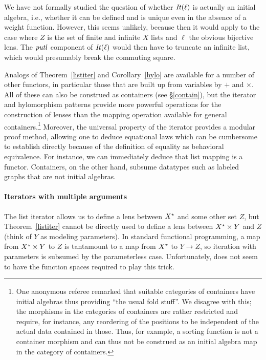 \begin{defn}[$R$-similarity]
\begin{theorem}
\begin{lemma}
\begin{theorem}[No products]
\begin{lemma}
\begin{defn}
\begin{theorem}
\begin{theorem}
\begin{corollary}[Hylomorphism]
We have not formally studied the question of whether $\mathit{It}(\ell)$
is actually an initial algebra, i.e., whether it can
be defined and is unique even in the absence of a weight function. However,
this seems unlikely, because then it would apply to the case where $Z$ is the
set of finite and infinite $X$ lists and $\ell$ the obvious bijective lens.
The $\mathit{putl}$ component of $\mathit{It}(\ell)$ would then have to truncate an infinite
list, which would presumably break the commuting square.

Analogs of Theorem~\ref{listiter} and
Corollary~\ref{hylo} are available for a number of other functors, in
particular those that are built up from variables by $+$ and $\times$.
All of these can also be construed as containers (see
\S\ref{contain}), but the iterator and hylomorphism patterns
provide more powerful operations for the construction of lenses than
the mapping operation available for general containers.\footnote{One anonymous referee remarked that suitable categories of containers have initial algebras thus providing ``the usual fold stuff''. We disagree with this; the morphisms in the categories of containers are rather restricted and require, for instance, any reordering of the positions to be independent of the actual data contained in those. Thus, for example, a sorting function is not a container morphism and can thus not be construed as an initial algebra map in the category of containers.} 
 Moreover, the
universal property of the iterator provides a modular proof method,
allowing one to deduce equational laws which can be cumbersome to
establish directly because of the definition of equality as behavioral
equivalence. For instance, we can immediately deduce that list mapping
is a functor. Containers, on the other hand, subsume datatypes such as labeled graphs that are not initial algebras. 

\paragraph{Iterators with multiple arguments}
The list iterator allows us to define a lens between $X^\star$ and some
other set $Z$, but Theorem~\ref{listiter} cannot be directly used to define
a lens between $X^\star \times Y$ and $Z$ (think of $Y$ as modeling
parameters).  In standard functional programming, a
map from $X^\star\times Y$ to $Z$ is tantamount to a map from $X^\star$
to $Y{\rightarrow}Z$, so iteration with parameters is subsumed by
the parameterless case. Unfortunately, \LENS{} does not seem to have the
function spaces required to play this trick.


\end{corollary}
\end{theorem}
\end{theorem}
\end{defn}
\end{lemma}
\end{theorem}
\end{lemma}
\end{theorem}
\end{defn}
